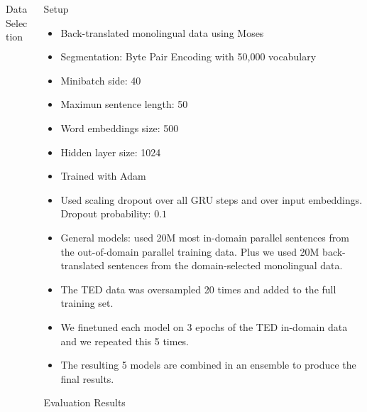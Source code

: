 \documentclass[20pt,final]{beamer}
\newcommand{\blockheading}[1]{\begin{center} \rule[-0.3cm]{0cm}{2.0cm} \Large #1 \vspace*{0.2cm} \end{center}}
\newcommand{\blockbegin}{\vspace{1em}\large}
\newcommand{\blockend}{\vspace*{0.2ex}}
\begin{document}
\begin{frame}{}
\begin{columns}[t]
\begin{column}{.45\linewidth}
\begin{block}{\blockheading{Data Selection}}
    \blockend
  \end{block}

\end{column}

\begin{column}{.45\linewidth}



  \begin{block}{\blockheading{Setup}}
    \blockbegin
      \begin{itemize}
      \item Back-translated monolingual data using Moses 
      \item Segmentation: Byte Pair Encoding with 50,000 vocabulary
      \item Minibatch side: 40
      \item Maximun sentence length: 50
      \item Word embeddings size: 500
      \item Hidden layer size: 1024
      \item Trained with Adam
      \item Used scaling dropout over all GRU steps and over input embeddings. Dropout probability: $0.1$
      \item General models: used 20M most in-domain parallel sentences from the out-of-domain parallel training data. Plus we used 20M back-translated sentences from the domain-selected monolingual data. 
      \item The TED data was oversampled 20 times and added to the full training set. 
      \item We finetuned each model on 3 epochs of the TED in-domain data and we repeated this 5 times.
      \item The resulting 5 models are combined in an ensemble to produce the final results. 
      \end{itemize}
      \vskip 0.2cm

    \blockend
  \end{block}


    \vskip 70mm



  \begin{block}{\blockheading{Evaluation Results}}
    \blockbegin


\end{block}
\end{column}
\end{columns}
\end{frame}
\end{document}
